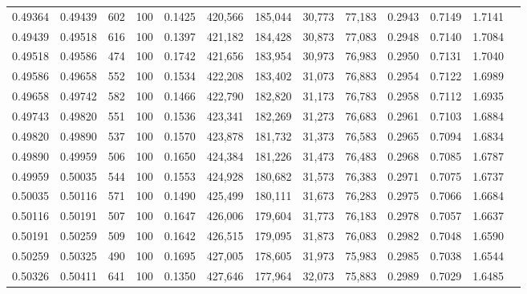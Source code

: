 \begin{tabular}{rrrrrrrrrrrrr}
0.49364 & 0.49439 &   602 & 100 &                                     0.1425 & 420,566 & 185,044 &  30,773 &  77,183 & 0.2943 & 0.7149 & 1.7141 \\
0.49439 & 0.49518 &   616 & 100 &                                     0.1397 & 421,182 & 184,428 &  30,873 &  77,083 & 0.2948 & 0.7140 & 1.7084 \\
0.49518 & 0.49586 &   474 & 100 &                                     0.1742 & 421,656 & 183,954 &  30,973 &  76,983 & 0.2950 & 0.7131 & 1.7040 \\
0.49586 & 0.49658 &   552 & 100 &                                     0.1534 & 422,208 & 183,402 &  31,073 &  76,883 & 0.2954 & 0.7122 & 1.6989 \\
0.49658 & 0.49742 &   582 & 100 &                                     0.1466 & 422,790 & 182,820 &  31,173 &  76,783 & 0.2958 & 0.7112 & 1.6935 \\
0.49743 & 0.49820 &   551 & 100 &                                     0.1536 & 423,341 & 182,269 &  31,273 &  76,683 & 0.2961 & 0.7103 & 1.6884 \\
0.49820 & 0.49890 &   537 & 100 &                                     0.1570 & 423,878 & 181,732 &  31,373 &  76,583 & 0.2965 & 0.7094 & 1.6834 \\
0.49890 & 0.49959 &   506 & 100 &                                     0.1650 & 424,384 & 181,226 &  31,473 &  76,483 & 0.2968 & 0.7085 & 1.6787 \\
0.49959 & 0.50035 &   544 & 100 &                                     0.1553 & 424,928 & 180,682 &  31,573 &  76,383 & 0.2971 & 0.7075 & 1.6737 \\
0.50035 & 0.50116 &   571 & 100 &                                     0.1490 & 425,499 & 180,111 &  31,673 &  76,283 & 0.2975 & 0.7066 & 1.6684 \\
0.50116 & 0.50191 &   507 & 100 &                                     0.1647 & 426,006 & 179,604 &  31,773 &  76,183 & 0.2978 & 0.7057 & 1.6637 \\
0.50191 & 0.50259 &   509 & 100 &                                     0.1642 & 426,515 & 179,095 &  31,873 &  76,083 & 0.2982 & 0.7048 & 1.6590 \\
0.50259 & 0.50325 &   490 & 100 &                                     0.1695 & 427,005 & 178,605 &  31,973 &  75,983 & 0.2985 & 0.7038 & 1.6544 \\
0.50326 & 0.50411 &   641 & 100 &                                     0.1350 & 427,646 & 177,964 &  32,073 &  75,883 & 0.2989 & 0.7029 & 1.6485 \\

\end{tabular}
